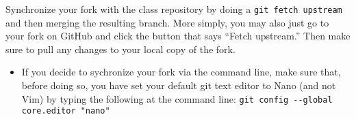 \documentclass[12pt,english]{exam}
\begin{document}
\begin{questions}
\question Synchronize your fork with the class repository by doing a \texttt{git fetch upstream} and then merging the resulting branch. More simply, you may also just go to your fork on GitHub and click the button that says ``Fetch upstream.'' Then make sure to pull any changes to your local copy of the fork. 
\begin{itemize}
	\item If you decide to sychronize your fork via the command line, make sure that, before doing so, you have set your default git text editor to Nano (and not Vim) by typing the following at the command line: \texttt{git config -{}-global core.editor "nano"}
\end{itemize}

\end{questions}
\end{document}
